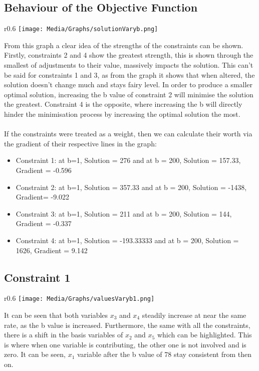 \documentclass{article}
\numberwithin{equation}{section}
\begin{document}
\subsection{Behaviour of the Objective Function}
\begin{wrapfigure}{r}{0.6\textwidth}
    \centering
    \texttt{[image: Media/Graphs/solutionVaryb.png]}
\end{wrapfigure}
From this graph a clear idea of the strengths of the constraints can be shown. Firstly, constraints 2 and 4 show the greatest strength, this is shown through the smallest of adjustments to their value, massively impacts the solution. This can't be said for constraints 1 and 3, as from the graph it shows that when altered, the solution doesn't change much and stays fairy level. In order to produce a smaller optimal solution, increasing the b value of constraint 2 will minimise the solution the greatest. Constraint 4 is the opposite, where increasing the b will directly hinder the minimisation process by increasing the optimal solution the most. \\ \\
If the constraints were treated as a weight, then we can calculate their worth via the gradient of their respective lines in the graph:
\begin{itemize}
    \item Constraint 1: at b=1, Solution = 276 and at b = 200, Solution = 157.33,    Gradient = -0.596
    \item Constraint 2: at b=1, Solution = 357.33 and at b = 200, Solution = -1438, Gradient= -9.022
    \item Constraint 3: at b=1, Solution = 211 and at b = 200, Solution = 144, Gradient = -0.337
    \item Constraint 4: at b=1, Solution = -193.33333 and at b = 200, Solution = 1626, Gradient = 9.142
\end{itemize}
\subsection{Constraint 1}
\begin{wrapfigure}{r}{0.6\textwidth}
    \centering
    \texttt{[image: Media/Graphs/valuesVaryb1.png]}
\end{wrapfigure}
It can be seen that both variables $x_3$ and $x_4$ steadily increase at near the same rate, as the b value is increased. Furthermore, the same with all the constraints, there is a shift in the basis variables of $x_2$ and $x_5$ which can be highlighted. This is where when one variable is contributing, the other one is not involved and is zero. It can be seen, $x_1$ variable after the b value of 78 stay consistent from then on. 
\newpage
\end{document}
